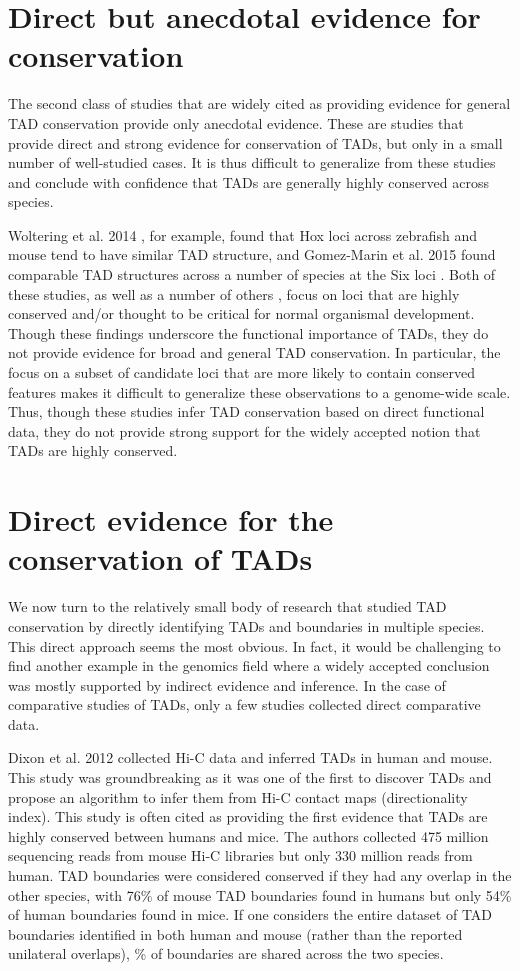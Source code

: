 \section{Direct but anecdotal evidence for conservation}
The second class of studies that are widely cited as providing evidence for general TAD conservation provide only anecdotal evidence. These are studies that provide direct and strong evidence for conservation of TADs, but only in a small number of well-studied cases. It is thus difficult to generalize from these studies and conclude with confidence that TADs are generally highly conserved across species.

Woltering et al. 2014 \cite{Woltering.2014}, for example, found that Hox loci across zebrafish and mouse tend to have similar TAD structure, and Gomez-Marin et al. 2015 found comparable TAD structures across a number of species at the Six loci \cite{Gomez-marin.2015}. Both of these studies, as well as a number of others \cite{Smith.2016, Lupianez.2015, Galupa.2018, Galupa.2020}, focus on loci that are highly conserved and/or thought to be critical for normal organismal development. Though these findings underscore the functional importance of TADs, they do not provide evidence for broad and general TAD conservation. In particular, the focus on a subset of candidate loci that are more likely to contain conserved features makes it difficult to generalize these observations to a genome-wide scale. Thus, though these studies infer TAD conservation based on direct functional data, they do not provide strong support for the widely accepted notion that TADs are highly conserved. 

\section{Direct evidence for the conservation of TADs}
We now turn to the relatively small body of research that studied TAD conservation by directly identifying TADs and boundaries in multiple species. This direct approach seems the most obvious. In fact, it would be challenging to find another example in the genomics field where a widely accepted conclusion was mostly supported by indirect evidence and inference. In the case of comparative studies of TADs, only a few studies collected direct comparative data.

Dixon et al. 2012 \cite{Dixon.2012} collected Hi-C data and inferred TADs in human and mouse. This study was groundbreaking as it was one of the first to discover TADs and propose an algorithm to infer them from Hi-C contact maps (directionality index). This study is often cited as providing the first evidence that TADs are highly conserved between humans and mice. The authors collected 475 million sequencing reads from mouse Hi-C libraries but only 330 million reads from human. TAD boundaries were considered conserved if they had any overlap in the other species, with 76\% of mouse TAD boundaries found in humans but only 54\% of human boundaries found in mice. If one considers the entire dataset of TAD boundaries identified in both human and mouse (rather than the reported unilateral overlaps), \% of boundaries are shared across the two species.

